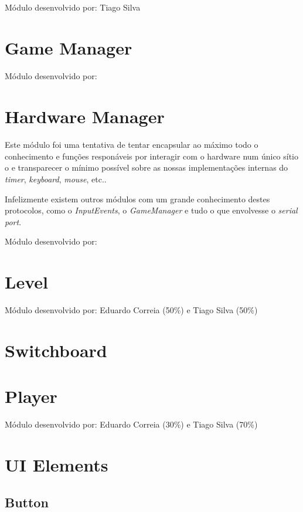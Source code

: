 \documentclass{report}
\begin{document}
Módulo desenvolvido por: Tiago Silva

\section{Game Manager}

Módulo desenvolvido por: 

\section{Hardware Manager}

\paragraph{}
Este módulo foi uma tentativa de tentar encapsular ao máximo todo o conhecimento e funções responáveis por interagir com o hardware num único sítio o e transparecer o mínimo possível sobre as nossas implementações internas do \textit{timer}, \textit{keyboard}, \textit{mouse}, etc..

Infelizmente existem outros módulos com um grande conhecimento destes protocolos, como o \textit{InputEvents}, o \textit{GameManager} e tudo o que envolvesse o \textit{serial port}.\newline

Módulo desenvolvido por: 

\section{Level}

Módulo desenvolvido por: Eduardo Correia (50\%) e Tiago Silva (50\%) 

\section{Switchboard}

\section{Player}

Módulo desenvolvido por: Eduardo Correia (30\%) e Tiago Silva (70\%) 

\section{UI Elements}

\subsection{Button}
\end{document}

